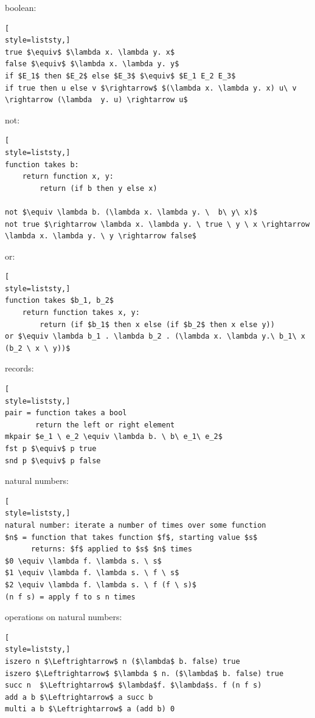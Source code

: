 boolean:
\begin{lstlisting}[
style=liststy,] 
true $\equiv$ $\lambda x. \lambda y. x$
false $\equiv$ $\lambda x. \lambda y. y$
if $E_1$ then $E_2$ else $E_3$ $\equiv$ $E_1 E_2 E_3$
if true then u else v $\rightarrow$ $(\lambda x. \lambda y. x) u\ v  \rightarrow (\lambda  y. u) \rightarrow u$  
\end{lstlisting}

not:
\begin{lstlisting}[
style=liststy,]
function takes b:
    return function x, y:
        return (if b then y else x)

not $\equiv \lambda b. (\lambda x. \lambda y. \  b\ y\ x)$
not true $\rightarrow \lambda x. \lambda y. \ true \ y \ x \rightarrow \lambda x. \lambda y. \ y \rightarrow false$ 
\end{lstlisting}

or:
\begin{lstlisting}[
style=liststy,] 
function takes $b_1, b_2$
    return function takes x, y:
        return (if $b_1$ then x else (if $b_2$ then x else y))
or $\equiv \lambda b_1 . \lambda b_2 . (\lambda x. \lambda y.\ b_1\ x (b_2 \ x \ y))$  
\end{lstlisting}

records:
\begin{lstlisting}[
style=liststy,] 
pair = function takes a bool
       return the left or right element
mkpair $e_1 \ e_2 \equiv \lambda b. \ b\ e_1\ e_2$  
fst p $\equiv$ p true
snd p $\equiv$ p false
\end{lstlisting}

natural numbers:
\begin{lstlisting}[
style=liststy,] 
natural number: iterate a number of times over some function
$n$ = function that takes function $f$, starting value $s$
      returns: $f$ applied to $s$ $n$ times
$0 \equiv \lambda f. \lambda s. \ s$
$1 \equiv \lambda f. \lambda s. \ f \ s$
$2 \equiv \lambda f. \lambda s. \ f (f \ s)$
(n f s) = apply f to s n times
\end{lstlisting}

operations on natural numbers:
\begin{lstlisting}[
style=liststy,] 
iszero n $\Leftrightarrow$ n ($\lambda$ b. false) true
iszero $\Leftrightarrow$ $\lambda $ n. ($\lambda$ b. false) true
succ n  $\Leftrightarrow$ $\lambda$f. $\lambda$s. f (n f s)
add a b $\Leftrightarrow$ a succ b
multi a b $\Leftrightarrow$ a (add b) 0
\end{lstlisting}


